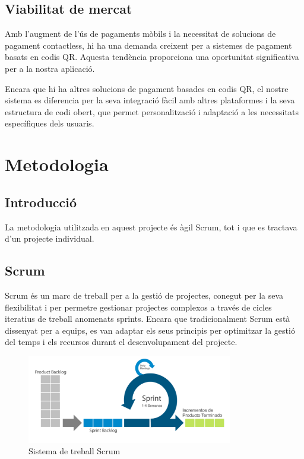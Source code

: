 \documentclass[a4paper,12pt,twoside]{ThesisStyle}
\begin{document}
\section{Viabilitat de mercat}
\label{subsec:Viabilitat de mercat}

Amb l'augment de l'ús de pagaments mòbils i la necessitat de solucions de pagament contactless, hi ha una demanda creixent per a sistemes de pagament basats en codis QR. Aquesta tendència proporciona una oportunitat significativa per a la nostra aplicació.

Encara que hi ha altres solucions de pagament basades en codis QR, el nostre sistema es diferencia per la seva integració fàcil amb altres plataformes i la seva estructura de codi obert, que permet personalització i adaptació a les necessitats específiques dels usuaris.


\chapter{Metodologia}
\label{chp:metodologia}


\section{Introducció}
\label{subsec: Introducció}

La metodologia utilitzada en aquest projecte és àgil Scrum, tot i que es tractava d'un projecte individual. 

\section{Scrum}
\label{subsec: Scrum}

Scrum és un marc de treball per a la gestió de projectes, conegut per la seva flexibilitat i per permetre gestionar projectes complexos a través de cicles iteratius de treball anomenats sprints. Encara que tradicionalment Scrum està dissenyat per a equips, es van adaptar els seus principis per optimitzar la gestió del temps i els recursos durant el desenvolupament del projecte.\\

\begin{figure}[h!] %
  \centering
  \includegraphics[width=0.8\textwidth]{imatges/scrum.png} %
  \caption{Sistema de treball Scrum} %
  \label{fig:Sistema de treball Scrum} %
\end{figure}
\end{document}
